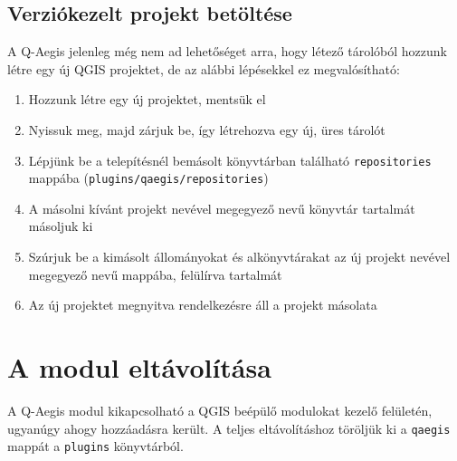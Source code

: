 \subsection{Verziókezelt projekt betöltése}
A Q-Aegis jelenleg még nem ad lehetőséget arra, hogy létező tárolóból hozzunk létre egy új QGIS projektet, de az alábbi lépésekkel ez megvalósítható:
\begin{enumerate}
	\item Hozzunk létre egy új projektet, mentsük el
	\item Nyissuk meg, majd zárjuk be, így létrehozva egy új, üres tárolót
	\item Lépjünk be a telepítésnél bemásolt könyvtárban található \texttt{repositories} mappába (\texttt{plugins/qaegis/repositories})
	\item A másolni kívánt projekt nevével megegyező nevű könyvtár tartalmát másoljuk ki
	\item Szúrjuk be a kimásolt állományokat és alkönyvtárakat az új projekt nevével megegyező nevű mappába, felülírva tartalmát
	\item Az új projektet megnyitva rendelkezésre áll a projekt másolata
\end{enumerate}
	
\section{A modul eltávolítása}
A Q-Aegis modul kikapcsolható a QGIS beépülő modulokat kezelő felületén, ugyanúgy ahogy hozzáadásra került. A teljes eltávolításhoz töröljük ki a \texttt{qaegis} mappát a \texttt{plugins} könyvtárból. 
	
